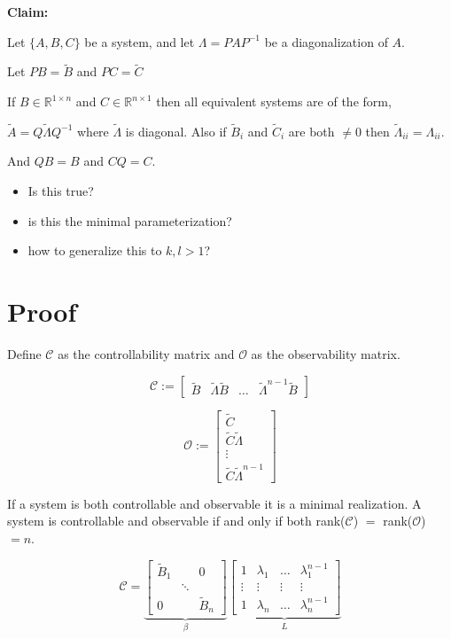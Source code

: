 \documentclass[a4paper, 11 pt]{article}
\begin{document}
   \textbf{Claim:} 
   
   Let $\{A, B, C \}$ be a system, and let $\Lambda=PAP^{-1}$ be a diagonalization of $A$.
   
   Let $PB=\tilde{B}$ and $PC=\tilde{C}$

   If $B \in \mathbb{R}^{1 \times n}$ and $C \in \mathbb{R}^{n \times 1}$ then all equivalent systems are of the form, 

   $\tilde{A} = Q \tilde{\Lambda} Q^{-1}$ where $\tilde{\Lambda}$ is diagonal. Also if $\tilde{B}_{i}$ and $\tilde{C}_{i}$ are both $\neq 0$ then $\tilde{\Lambda}_{ii}=\Lambda_{ii}$. 

   And $QB=B$ and $CQ=C$.

   \begin{itemize}
     \item Is this true?
     \item is this the minimal parameterization?
     \item how to generalize this to $k, l > 1$?
   \end{itemize}

   \section{Proof}
   Define $\mathcal{C}$ as the controllability matrix and $\mathcal{O}$ as the observability matrix. 

   \begin{equation}
     \mathcal{C} := \begin{bmatrix} \tilde{B} & \tilde{\Lambda} \tilde{B} & \hdots & \tilde{\Lambda}^{n-1} \tilde{B} \end{bmatrix}
   \end{equation}

   \begin{equation}
     \mathcal{O} := \begin{bmatrix} \tilde{C} \\ \tilde{C} \tilde{\Lambda}  \\ \vdots \\ \tilde{C} \tilde{\Lambda}^{n-1} \end{bmatrix}
   \end{equation}

    If a system is both controllable and observable it is a minimal realization. A system is controllable and observable if and only if both rank($\mathcal{C}$) $=$ rank($\mathcal{O}$) $= n$. 

    \begin{equation}
      \mathcal{C} = \underbrace{\begin{bmatrix} \tilde{B}_{1} & & 0 \\ & \ddots & \\ 0 & & \tilde{B}_{n} \end{bmatrix}}_{\beta} \underbrace{\begin{bmatrix} 1 & \lambda_{1} & \hdots & \lambda_{1}^{n-1} \\ \vdots & \vdots & \vdots & \vdots \\ 1 & \lambda_{n} & \hdots & \lambda_{n}^{n-1} \end{bmatrix}}_{L}
    \end{equation}
\end{document}
